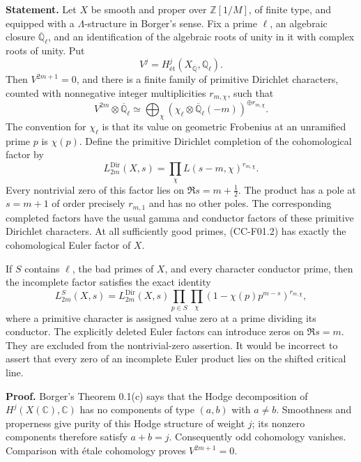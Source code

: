 \documentclass[11pt,a4paper]{article}
\theoremstyle{definition}\newtheorem{definition}[theorem]{Definition}
\theoremstyle{remark}\newtheorem{remark}[theorem]{Remark}
\begin{document}
\textbf{Statement.} Let \(X\) be smooth and proper over
\(\mathbb Z[1/M]\), of finite type, and equipped with a
\(\Lambda\)-structure in Borger's sense. Fix a prime \(\ell\), an
algebraic closure \(\overline{\mathbb Q}_\ell\), and an identification
of the algebraic roots of unity in it with complex roots of unity. Put
\[
 V^j=H^j_{\text{ét}}(X_{\overline{\mathbb Q}},\mathbb Q_\ell).
\] Then \(V^{2m+1}=0\), and there is a finite family of primitive
Dirichlet characters, counted with nonnegative integer multiplicities
\(r_{m,\chi}\), such that \[
 V^{2m}\otimes\overline{\mathbb Q}_\ell
 \simeq\bigoplus_\chi(\chi_\ell\otimes\overline{\mathbb Q}_\ell(-m))^{\oplus r_{m,\chi}}.
 \tag{CC-F01.1}
\] The convention for \(\chi_\ell\) is that its value on geometric
Frobenius at an unramified prime \(p\) is \(\chi(p)\). Define the
primitive Dirichlet completion of the cohomological factor by \[
 L^{\mathrm{Dir}}_{2m}(X,s)=\prod_\chi L(s-m,\chi)^{r_{m,\chi}}.
 \tag{CC-F01.2}
\] Every nontrivial zero of this factor lies on \(\Re s=m+\tfrac12\).
The product has a pole at \(s=m+1\) of order precisely \(r_{m,1}\) and
has no other poles. The corresponding completed factors have the usual
gamma and conductor factors of these primitive Dirichlet characters. At
all sufficiently good primes, (CC-F01.2) has exactly the cohomological
Euler factor of \(X\).

If \(S\) contains \(\ell\), the bad primes of \(X\), and every character
conductor prime, then the incomplete factor satisfies the exact identity
\[
 L^S_{2m}(X,s)
 =L^{\mathrm{Dir}}_{2m}(X,s)
   \prod_{p\in S}\prod_\chi
       (1-\chi(p)p^{m-s})^{r_{m,\chi}},
 \tag{CC-F01.3}
\] where a primitive character is assigned value zero at a prime
dividing its conductor. The explicitly deleted Euler factors can
introduce zeros on \(\Re s=m\). They are excluded from the
nontrivial-zero assertion. It would be incorrect to assert that every
zero of an incomplete Euler product lies on the shifted critical line.

\textbf{Proof.} Borger's Theorem 0.1(c) says that the Hodge
decomposition of \(H^j(X(\mathbb C),\mathbb C)\) has no components of
type \((a,b)\) with \(a\ne b\). Smoothness and properness give purity of
this Hodge structure of weight \(j\); its nonzero components therefore
satisfy \(a+b=j\). Consequently odd cohomology vanishes. Comparison with
étale cohomology proves \(V^{2m+1}=0\).
\end{document}
